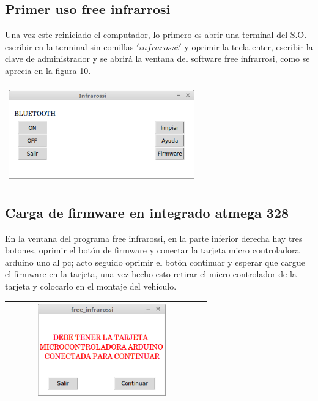\documentclass[12]{article}
\newenvironment{Figure}
{\par\medskip\noindent\minipage{\linewidth}}
{\endminipage\par\medskip}
\begin{document}
\begin{multicols}{2}
\subsection{Primer uso free infrarrosi}

Una vez este reiniciado el computador, lo primero  es abrir una terminal del S.O. escribir en la terminal sin comillas $'infrarossi'$ y oprimir la tecla enter, escribir la clave de administrador y se abrirá la ventana del software free infrarrosi, como se aprecia en la figura 10.
\begin{Figure}	
\center
\begin{tabular}{|l|r|}
\hline
\includegraphics[width=8cm, height=4cm]{img/infrarossi.png} \\ \hline
\end{tabular}
\label{fig:g10}
\end{Figure}


\subsection{Carga de firmware en integrado atmega 328}
En la ventana del programa free infrarossi, en la parte inferior derecha hay tres botones, oprimir el botón de firmware y conectar la tarjeta micro controladora arduino uno al pc; acto seguido oprimir el botón continuar y esperar que cargue el firmware en la tarjeta, una vez hecho esto retirar el micro controlador de la tarjeta y colocarlo en el montaje del vehículo.
\begin{Figure}	
\center
\begin{tabular}{|l|r|}
\hline
\includegraphics[width=8cm, height=4cm]{img/firmware.png} \\ \hline
\end{tabular}
\label{fig:g11}
\end{Figure}



\end{multicols}
\end{document}
